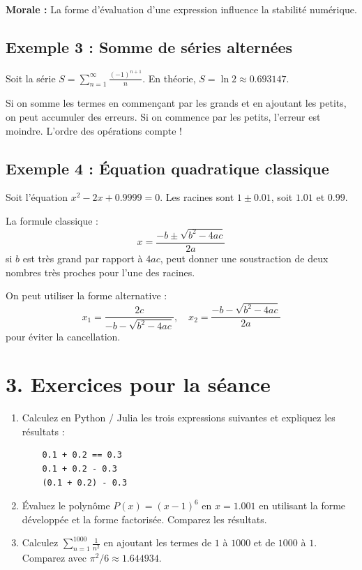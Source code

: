 \documentclass[12pt,letterpaper]{article}
\begin{document}
\textbf{Morale :} La forme d'évaluation d'une expression influence la stabilité numérique.

\subsection*{Exemple 3 : Somme de séries alternées}

Soit la série $S = \sum_{n=1}^{\infty} \frac{(-1)^{n+1}}{n}$. En théorie, $S = \ln 2 \approx 0.693147$.

Si on somme les termes en commençant par les grands et en ajoutant les petits, on peut accumuler des erreurs. Si on commence par les petits, l'erreur est moindre. L'ordre des opérations compte !

\subsection*{Exemple 4 : Équation quadratique classique}

Soit l'équation $x^2 - 2x + 0.9999 = 0$. Les racines sont $1 \pm 0.01$, soit $1.01$ et $0.99$.

La formule classique :
\[
x = \frac{-b \pm \sqrt{b^2 - 4ac}}{2a}
\]
si $b$ est très grand par rapport à $4ac$, peut donner une soustraction de deux nombres très proches pour l'une des racines.

On peut utiliser la forme alternative :
\[
x_1 = \frac{2c}{-b - \sqrt{b^2 - 4ac}}, \quad x_2 = \frac{-b - \sqrt{b^2 - 4ac}}{2a}
\]
pour éviter la cancellation.

\section*{3. Exercices pour la séance}

\begin{enumerate}
    \item Calculez en Python / Julia les trois expressions suivantes et expliquez les résultats :
    \begin{verbatim}
    0.1 + 0.2 == 0.3
    0.1 + 0.2 - 0.3
    (0.1 + 0.2) - 0.3
    \end{verbatim}
    
    \item Évaluez le polynôme $P(x) = (x-1)^6$ en $x = 1.001$ en utilisant la forme développée et la forme factorisée. Comparez les résultats.

    \item Calculez $\sum_{n=1}^{1000} \frac{1}{n^2}$ en ajoutant les termes de $1$ à $1000$ et de $1000$ à $1$. Comparez avec $\pi^2/6 \approx 1.644934$.
\end{enumerate}
\end{document}
